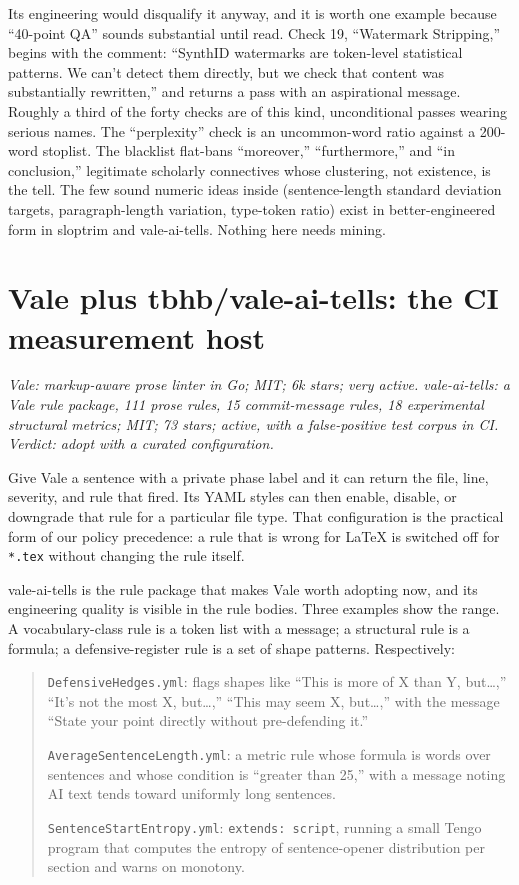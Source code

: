 Its engineering would disqualify it anyway, and it is worth one example
because ``40-point QA'' sounds substantial until read. Check 19, ``Watermark
Stripping,'' begins with the comment: ``SynthID watermarks are token-level
statistical patterns. We can't detect them directly, but we check that
content was substantially rewritten,'' and returns a pass with an
aspirational message. Roughly a third of the forty checks are of this kind,
unconditional passes wearing serious names. The ``perplexity'' check is an
uncommon-word ratio against a 200-word stoplist. The blacklist flat-bans
``moreover,'' ``furthermore,'' and ``in conclusion,'' legitimate scholarly
connectives whose clustering, not existence, is the tell. The few sound
numeric ideas inside (sentence-length standard deviation targets,
paragraph-length variation, type-token ratio) exist in better-engineered
form in sloptrim and vale-ai-tells. Nothing here needs mining.

\section{Vale plus tbhb/vale-ai-tells: the CI measurement host}
\label{sec:oss-vale}

\emph{Vale: markup-aware prose linter in Go; MIT; 6k stars; very active.
vale-ai-tells: a Vale rule package, 111 prose rules, 15 commit-message
rules, 18 experimental structural metrics; MIT; 73 stars; active, with a
false-positive test corpus in CI. Verdict: adopt with a curated
configuration.}

Give Vale a sentence with a private phase label and it can return the file,
line, severity, and rule that fired. Its YAML styles can then enable, disable,
or downgrade that rule for a particular file type. That configuration is the
practical form of our policy precedence: a rule that is wrong for LaTeX is
switched off for \texttt{*.tex} without changing the rule itself.

vale-ai-tells is the rule package that makes Vale worth adopting now, and
its engineering quality is visible in the rule bodies. Three examples show
the range. A vocabulary-class rule is a token list with a message; a
structural rule is a formula; a defensive-register rule is a set of shape
patterns. Respectively:

\begin{quote}\small
\texttt{DefensiveHedges.yml}: flags shapes like ``This is more of X than Y,
but\ldots,'' ``It's not the most X, but\ldots,'' ``This may seem X,
but\ldots,'' with the message ``State your point directly without
pre-defending it.''

\texttt{Average\-Sentence\-Length.yml}: a metric rule whose formula is
words over sentences and whose condition is ``greater than 25,'' with a
message noting AI text tends toward uniformly long sentences.

\texttt{SentenceStartEntropy.yml}: \texttt{extends: script}, running a
small Tengo program that computes the entropy of sentence-opener
distribution per section and warns on monotony.
\end{quote}

